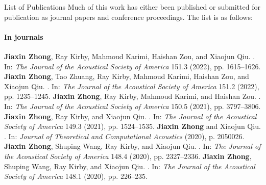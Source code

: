 \documentclass[
    11pt, %
    english, %
    onehalfspacing, %
    headsepline, %
]{MastersDoctoralThesis} %
\begin{document}
\begin{frontmatterpage}{List of Publications}
    \label{chap:publication}
    Much of this work has   either been published or submitted for publication as journal papers and conference proceedings. The list is as follows:

    \noindent \paragraph{In journals}
    \begin{outline}[enumerate]
        \1 \textbf{Jiaxin Zhong}, Ray Kirby, Mahmoud Karimi, Haishan Zou, and Xiaojun Qiu. . In: \textit{The Journal of the Acoustical Society of America} 151.3 (2022), pp. 1615--1626.
        \1 \textbf{Jiaxin Zhong}, Tao Zhuang, Ray Kirby, Mahmoud Karimi, Haishan Zou, and Xiaojun Qiu. . In: \textit{The Journal of the Acoustical Society of America} 151.2 (2022), pp. 1235--1245.
        \1 \textbf{Jiaxin Zhong}, Ray Kirby, Mahmoud Karimi, and Haishan Zou. . In: \textit{The Journal of the Acoustical Society of America} 150.5 (2021), pp. 3797--3806.
        \1 \textbf{Jiaxin Zhong}, Ray Kirby, and Xiaojun Qiu. . In: \textit{The Journal of the Acoustical Society of America} 149.3 (2021), pp. 1524--1535.
        \1 \textbf{Jiaxin Zhong} and Xiaojun Qiu. . In: \textit{Journal of Theoretical and Computational Acoustics} (2020), p. 2050026.
        \1 \textbf{Jiaxin Zhong}, Shuping Wang, Ray Kirby, and Xiaojun Qiu. . In: \textit{The Journal of the Acoustical Society of America} 148.4 (2020), pp. 2327--2336.
        \1 \textbf{Jiaxin Zhong}, Shuping Wang, Ray Kirby, and Xiaojun Qiu. . In: \textit{The Journal of the Acoustical Society of America} 148.1 (2020), pp. 226--235.

\end{outline}
\end{frontmatterpage}
\end{document}
